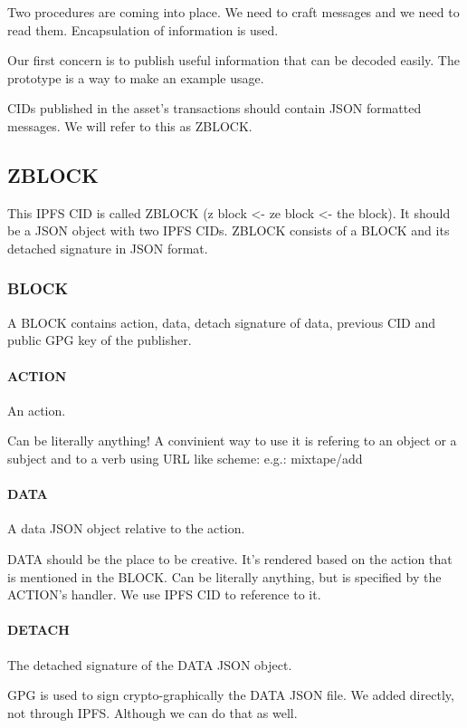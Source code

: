 \documentclass[10pt,a4paper]{paper}
\begin{document}
	Two procedures are coming into place. We need to craft messages and we need to read them. Encapsulation of information is used.

	Our first concern is to publish useful information that can be decoded easily. The prototype is a way to make an example usage.
	
	CIDs published in the asset's transactions should contain JSON formatted messages. We will refer to this as ZBLOCK.
	
	\subsection{ZBLOCK}\label{zblock}
	This IPFS CID is called ZBLOCK (z block \textless- ze block \textless-
	the block).
	It should be a JSON object with two IPFS CIDs. ZBLOCK consists of a BLOCK and its detached signature in JSON format.
	

	\subsubsection{BLOCK}\label{block}
	
	A BLOCK contains action, data, detach signature of data, previous CID and public GPG key of the publisher.

	\paragraph{ACTION}\label{action}
	An action.
	
	
	Can be literally anything! A convinient way to use it is refering to an
	object or a subject and to a verb using URL like scheme: e.g.:
	mixtape/add
	
	\paragraph{DATA}\label{data}
	A data JSON object relative to the action.
	
	
	DATA should be the place to be creative. It's rendered based on the action that is mentioned in the BLOCK. Can be literally anything, but is specified by the ACTION's handler. We use IPFS CID to reference to it.
	
	\paragraph{DETACH}\label{detach}
		The detached signature of the DATA JSON object.
		
		GPG is used to sign crypto-graphically the DATA JSON file. We added directly, not through IPFS. Although we can do that as well.
\end{document}
